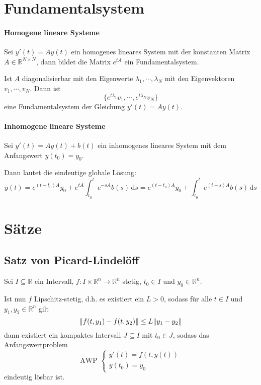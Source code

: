 \section{Fundamentalsystem}
	\paragraph{Homogene lineare Systeme}
		Sei $ y'(t) = Ay(t) $ ein homogenes lineares System mit der konstanten Matrix $ A \in \mathbb{R} ^ { N \times N } $, dann bildet die Matrix $ e ^ { tA } $ ein Fundamentalsystem.

		Ist $ A $ diagonalisierbar mit den Eigenwerte $ \lambda _ 1, \cdots, \lambda _ N $ mit den Eigenvektoren $ v _ 1, \cdots, v _ N $. Dann ist \[ \{ e ^ { t \lambda _ 1 } v _ 1, \cdots, e ^ { t \lambda _ N } v _ N \} \] eine Fundamentalsystem der Gleichung $ y'(t) = Ay(t) $.

	\paragraph{Inhomogene lineare Systeme}
		Sei $ y'(t) = Ay(t) + b(t) $ ein inhomogenes lineares System mit dem Anfangswert $ y(t _ 0) = y _ 0 $.

		Dann lautet die eindeutige globale Lösung:
		\begin{equation*}
			y(t) = e ^ { (t - t _ 0)A } y _ 0 + e ^ { tA } \int _ { t _ 0 } ^ t \! e ^ { -sA } b(s) \, \mathrm{d}s = e ^ { (t - t _ 0) A } y _ 0 + \int _ { t _ 0 } ^ t \! e ^ { (t - s) A } b(s) \, \mathrm{d}s
		\end{equation*}

\section{Sätze}
	\subsection{Satz von Picard-Lindelöff}
		Sei $ I \subseteq \mathbb{R} $ ein Intervall, $ f : I \times \mathbb{R} ^ n \rightarrow \mathbb{R} ^ n $ stetig, $ t _ 0 \in I $ und $ y _ 0 \in \mathbb{R} ^ n $.

		Ist nun $ f $ Lipschitz-stetig, d.h. es existiert ein $ L > 0 $, sodass für alle $ t \in I $ und $ y _ 1, y _ 2 \in \mathbb{R} ^ n $ gilt \[ \norm{f(t, y _ 1) - f(t, y _ 2)} \leq L\norm{y _ 1 - y _ 2} \] dann existiert ein kompaktes Intervall $ J \subseteq I $ mit $ t _ 0 \in J $, sodass das Anfangswertproblem
		\begin{equation*}
			\text{AWP }
			\begin{cases}
				y'(t) = f(t, y(t)) \\
				y(t _ 0) = y _ 0
			\end{cases}
		\end{equation*}
		eindeutig lösbar ist.


